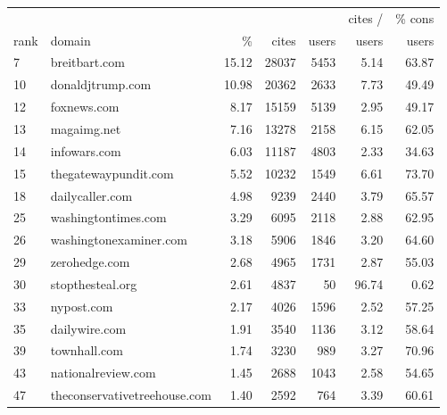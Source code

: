 \begin{tabular}{llrrrrr}
\toprule
 & & & & & cites / & \% cons \\
rank & domain & \% & cites & users & users & users \\
\midrule
7                &                 breitbart.com &   15.12 &   28037 &    5453 &         5.14 &         63.87 \\
10               &              donaldjtrump.com &   10.98 &   20362 &    2633 &         7.73 &         49.49 \\
12               &                   foxnews.com &    8.17 &   15159 &    5139 &         2.95 &         49.17 \\
13               &                   magaimg.net &    7.16 &   13278 &    2158 &         6.15 &         62.05 \\
14               &                  infowars.com &    6.03 &   11187 &    4803 &         2.33 &         34.63 \\
15               &          thegatewaypundit.com &    5.52 &   10232 &    1549 &         6.61 &         73.70 \\
18               &               dailycaller.com &    4.98 &    9239 &    2440 &         3.79 &         65.57 \\
25               &           washingtontimes.com &    3.29 &    6095 &    2118 &         2.88 &         62.95 \\
26               &        washingtonexaminer.com &    3.18 &    5906 &    1846 &         3.20 &         64.60 \\
29               &                 zerohedge.com &    2.68 &    4965 &    1731 &         2.87 &         55.03 \\
30               &              stopthesteal.org &    2.61 &    4837 &      50 &        96.74 &          0.62 \\
33               &                    nypost.com &    2.17 &    4026 &    1596 &         2.52 &         57.25 \\
35               &                 dailywire.com &    1.91 &    3540 &    1136 &         3.12 &         58.64 \\
39               &                  townhall.com &    1.74 &    3230 &     989 &         3.27 &         70.96 \\
43               &            nationalreview.com &    1.45 &    2688 &    1043 &         2.58 &         54.65 \\
47               &  theconservativetreehouse.com &    1.40 &    2592 &     764 &         3.39 &         60.61 \\

\end{tabular}
